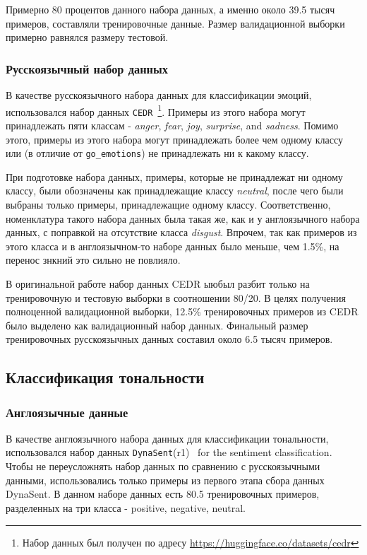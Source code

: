 Примерно 80 процентов данного набора данных, а именно около 39.5 тысяч примеров, составляли тренировочные данные. Размер валидационной выборки примерно равнялся размеру тестовой. 

\subsubsection{Русскоязычный набор данных} 
В качестве русскоязычного набора данных для классификации эмоций, использовался набор данных \texttt{CEDR}~\cite{ru_emotions}\footnote{Набор данных был получен по адресу \url{https://huggingface.co/datasets/cedr}}. Примеры из этого набора могут принадлежать пяти классам - \textit{anger}, \textit{fear}, \textit{joy}, \textit{surprise}, and \textit{sadness}. Помимо этого, примеры из этого набора могут принадлежать более чем одному классу или (в отличие от \texttt{go\_emotions}) не принадлежать ни к какому классу. 

При подготовке набора данных, примеры, которые не принадлежат ни одному классу, были обозначены как принадлежащие классу \textit{neutral}, после чего были выбраны только примеры, принадлежащие одному классу. Соответственно, номенклатура такого набора данных была такая же, как и у англоязычного набора данных, с поправкой на отсутствие класса \textit{disgust}. Впрочем, так как примеров из этого класса и в англоязычном-то наборе данных было меньше, чем 1.5\%, на перенос знкний это сильно не повлияло. 

В оригинальной работе набор данных CEDR ыюбыл разбит только на тренировочную и тестовую выборки в соотношении 80/20. В целях получения полноценной валидационной выборки, 12.5\% тренировочных примеров из CEDR было выделено как валидационный набор данных. Финальный размер тренировочных русскоязычных данных составил около 6.5 тысяч примеров.


\subsection{Классификация тональности}

\subsubsection{Англоязычные данные} 
В качестве англоязычного набора данных для классификации тональности, использовался набор данных \texttt{DynaSent}(r1)~\cite{sentiment} for the sentiment classification. Чтобы не переусложнять набор данных по сравнению с русскоязычными данными, использовались только примеры из первого этапа сбора данных DynaSent. В данном наборе данных есть 80.5 тренировочных примеров, разделенных на три класса - positive, negative, neutral. 

